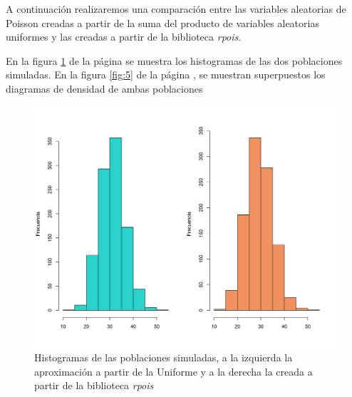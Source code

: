 \documentclass{article}
\begin{document}
A continuación realizaremos una comparación entre las variables aleatorias de Poisson creadas a partir de la suma del producto de variables aleatorias uniformes y las creadas a partir de la biblioteca \textit{rpois}.

En la figura \ref{fig:4} de la página \pageref{fig:4} se muestra los histogramas de las dos poblaciones simuladas. En la figura \ref{fig:5} de la página \pageref{fig:5}, se muestran superpuestos los diagramas de densidad de ambas poblaciones 

\begin{center}
\begin{figure}
\includegraphics[scale=0.65]{figuras/AproxU2301.png}
\caption{Histogramas de las poblaciones simuladas, a la izquierda la aproximación a partir de la Uniforme y a la derecha la creada a partir de la biblioteca \textit{rpois}}
\label{fig:4}
\end{figure}
\end{center}
\end{document}
